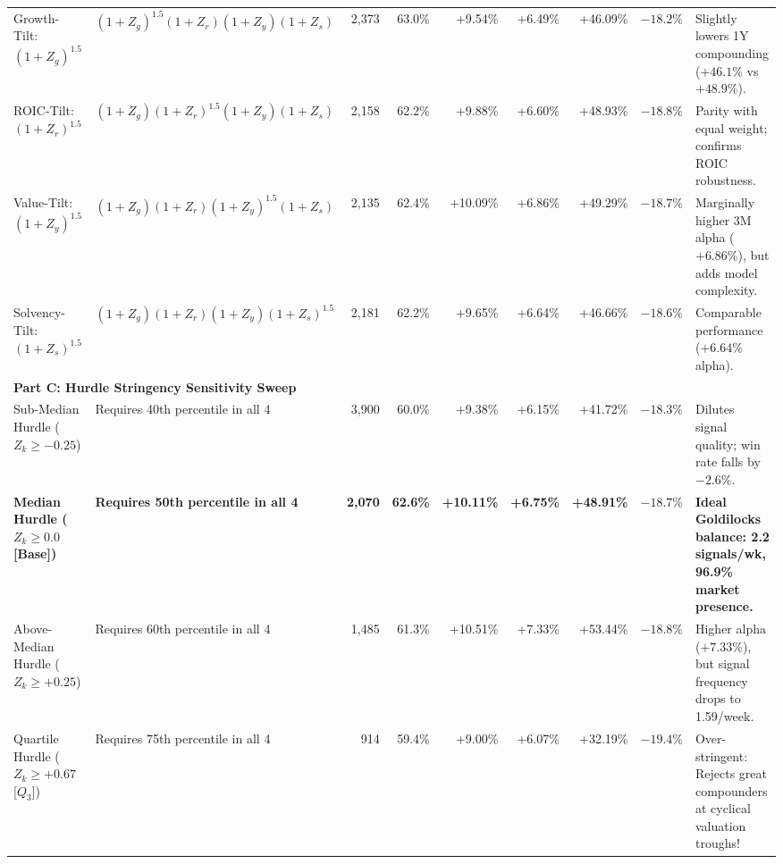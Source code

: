 \documentclass[10pt,twocolumn]{article}
\begin{document}
\begin{table}[t!]
{\begin{tabular}{llrrrrrrl}
Growth-Tilt: $(1+Z_g)^{1.5}$ & $(1+Z_g)^{1.5}(1+Z_r)(1+Z_y)(1+Z_s)$ & 2,373 & 63.0\% & +9.54\% & +6.49\% & +46.09\% & $-18.2\%$ & Slightly lowers 1Y compounding ($+46.1\%$ vs $+48.9\%$). \\
ROIC-Tilt: $(1+Z_r)^{1.5}$ & $(1+Z_g)(1+Z_r)^{1.5}(1+Z_y)(1+Z_s)$ & 2,158 & 62.2\% & +9.88\% & +6.60\% & +48.93\% & $-18.8\%$ & Parity with equal weight; confirms ROIC robustness. \\
Value-Tilt: $(1+Z_y)^{1.5}$ & $(1+Z_g)(1+Z_r)(1+Z_y)^{1.5}(1+Z_s)$ & 2,135 & 62.4\% & +10.09\% & +6.86\% & +49.29\% & $-18.7\%$ & Marginally higher 3M alpha ($+6.86\%$), but adds model complexity. \\
Solvency-Tilt: $(1+Z_s)^{1.5}$ & $(1+Z_g)(1+Z_r)(1+Z_y)(1+Z_s)^{1.5}$ & 2,181 & 62.2\% & +9.65\% & +6.64\% & +46.66\% & $-18.6\%$ & Comparable performance ($+6.64\%$ alpha). \\
\midrule
\multicolumn{9}{l}{\textbf{Part C: Hurdle Stringency Sensitivity Sweep}} \\
Sub-Median Hurdle ($Z_k \ge -0.25$) & Requires 40th percentile in all 4 & 3,900 & 60.0\% & +9.38\% & +6.15\% & +41.72\% & $-18.3\%$ & Dilutes signal quality; win rate falls by $-2.6\%$. \\
\textbf{Median Hurdle ($Z_k \ge 0.0$ [Base])} & \textbf{Requires 50th percentile in all 4} & \textbf{2,070} & \textbf{62.6\%} & \textbf{+10.11\%} & \textbf{+6.75\%} & \textbf{+48.91\%} & \textbf{$-18.7\%$} & \textbf{Ideal Goldilocks balance: 2.2 signals/wk, 96.9\% market presence.} \\
Above-Median Hurdle ($Z_k \ge +0.25$) & Requires 60th percentile in all 4 & 1,485 & 61.3\% & +10.51\% & +7.33\% & +53.44\% & $-18.8\%$ & Higher alpha ($+7.33\%$), but signal frequency drops to 1.59/week. \\
Quartile Hurdle ($Z_k \ge +0.67$ [$Q_3$]) & Requires 75th percentile in all 4 & 914 & 59.4\% & +9.00\% & +6.07\% & +32.19\% & $-19.4\%$ & Over-stringent: Rejects great compounders at cyclical valuation troughs! \\
\bottomrule
\end{tabular}%
}
\end{table}
\end{document}
